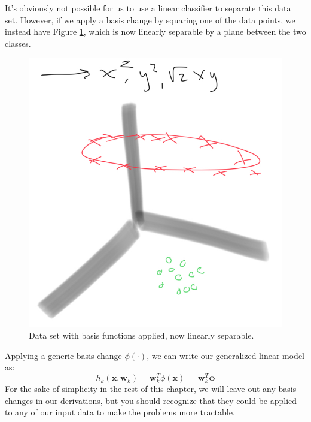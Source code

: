 It's obviously not possible for us to use a linear classifier to separate this data set. However, if we apply a basis change by squaring one of the data points, we instead have Figure \ref{fig:circles-with-basis-change}, which is now linearly separable by a plane between the two classes.
\begin{figure}
    \centering
    \includegraphics[width=0.5\paperwidth]{../Classification/fig/circles_with_basis_change_ipad.jpg}
    \caption{Data set with basis functions applied, now linearly separable.}
    \label{fig:circles-with-basis-change}
\end{figure}
Applying a generic basis change $\phi(\cdot)$, we can write our generalized linear model as:
\begin{equation} \label{basis-changed-linear-model}
    h_{k}(\textbf{x}, \textbf{w}_{k}) = \textbf{w}_{k}^{T}\phi{(\textbf{x})} = \ \textbf{w}_{k}^{T}\boldsymbol{\phi}
\end{equation}
For the sake of simplicity in the rest of this chapter, we will leave out any basis changes in our derivations, but you should recognize that they could be applied to any of our input data to make the problems more tractable.


